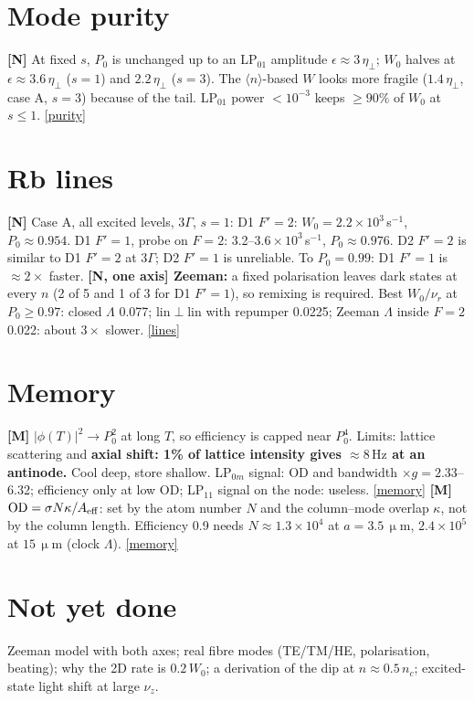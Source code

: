 \documentclass[10pt,a4paper]{article}
\newcommand{\etaeff}{\eta_{\perp}}
\newcommand{\SI}[2]{\ensuremath{#1\,\mathrm{#2}}}
\newcommand{\more}[2]{\href{report.pdf\##1}{[#2]}}
\begin{document}
\section*{Mode purity}
\textbf{[N]} At fixed $s$, $P_0$ is unchanged up to an LP$_{01}$ amplitude $\epsilon\approx3\,\etaeff$; $W_0$ halves at $\epsilon\approx3.6\,\etaeff$ ($s=1$) and $2.2\,\etaeff$ ($s=3$). The $\langle n\rangle$-based $W$ looks more fragile ($1.4\,\etaeff$, case A, $s=3$) because of the tail. LP$_{01}$ power $<10^{-3}$ keeps $\ge90\%$ of $W_0$ at $s\le1$. \more{d:purity}{purity}

\section*{Rb lines}
\textbf{[N]} Case A, all excited levels, $3\Gamma$, $s=1$: D1 $F'=2$: $W_0=2.2\times10^3\,$s$^{-1}$, $P_0\approx0.954$. D1 $F'=1$, probe on $F=2$: 3.2--$3.6\times10^3\,$s$^{-1}$, $P_0\approx0.976$. D2 $F'=2$ is similar to D1 $F'=2$ at $3\Gamma$; D2 $F'=1$ is unreliable. To $P_0=0.99$: D1 $F'=1$ is $\approx2\times$ faster. \textbf{[N, one axis] Zeeman:} a fixed polarisation leaves dark states at every $n$ (2 of 5 and 1 of 3 for D1 $F'=1$), so remixing is required. Best $W_0/\nu_r$ at $P_0\ge0.97$: closed $\Lambda$ 0.077; lin$\perp$lin with repumper 0.0225; Zeeman $\Lambda$ inside $F=2$ 0.022: about $3\times$ slower. \more{d:lines}{lines}

\section*{Memory}
\textbf{[M]} $|\phi(T)|^2\to P_0^2$ at long $T$, so efficiency is capped near $P_0^4$. Limits: lattice scattering and \textbf{axial shift: 1\% of lattice intensity gives $\approx\SI{8}{Hz}$ at an antinode.} Cool deep, store shallow. LP$_{0m}$ signal: OD and bandwidth $\times g=2.33$--6.32; efficiency only at low OD; LP$_{11}$ signal on the node: useless. \more{d:memory}{memory}
\textbf{[M]} ${\rm OD}=\sigma N\kappa/A_{\rm eff}$: set by the atom number $N$ and the column--mode overlap $\kappa$, not by the column length. Efficiency 0.9 needs $N\approx1.3\times10^4$ at $a=\SI{3.5}{\upmu m}$, $2.4\times10^5$ at \SI{15}{\upmu m} (clock $\Lambda$). \more{d:memory}{memory}

\section*{Not yet done}
Zeeman model with both axes; real fibre modes (TE/TM/HE, polarisation, beating); why the 2D rate is $0.2\,W_0$; a derivation of the dip at $n\approx0.5\,n_c$; excited-state light shift at large $\nu_z$.
\end{document}
